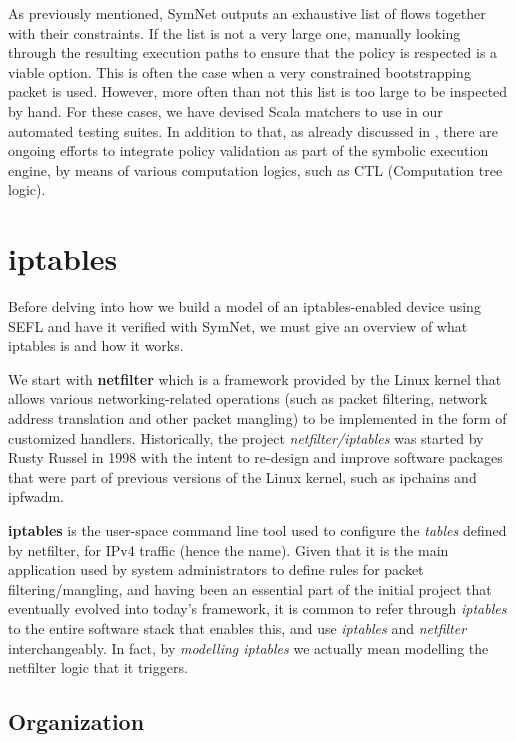 As previously mentioned, SymNet outputs an exhaustive list of flows together
with their constraints.  If the list is not a very large one, manually looking
through the resulting execution paths to ensure that the policy is respected is
a viable option.  This is often the case when a very constrained bootstrapping
packet is used.  However, more often than not this list is too large to be
inspected by hand.  For these cases, we have devised Scala matchers to use in
our automated testing suites.  In addition to that, as already discussed in
, there are ongoing efforts to
integrate policy validation as part of the symbolic execution engine, by means
of various computation logics, such as CTL (Computation tree
logic).


\section{iptables}

Before delving into how we build a model of an iptables-enabled device using
SEFL and have it verified with SymNet, we must give an overview of what
iptables is and how it works.

We start with \textbf{netfilter} which is a framework provided by the Linux
kernel that allows various networking-related operations (such as packet
filtering, network address translation and other packet mangling) to be
implemented in the form of customized handlers.  Historically, the project
\emph{netfilter/iptables} was started by Rusty Russel in 1998 with the intent
to re-design and improve software packages that were part of previous versions
of the Linux kernel, such as ipchains and ipfwadm.

\textbf{iptables} is the user-space command line tool used to configure the
\emph{tables} defined by netfilter, for IPv4 traffic (hence the name). Given
that it is the main application used by system administrators to define rules
for packet filtering/mangling, and having been an essential part of the initial
project that eventually evolved into today's framework, it is common to refer
through \emph{iptables} to the entire software stack that enables this, and use
\emph{iptables} and \emph{netfilter} interchangeably.  In fact, by
\emph{modelling iptables} we actually mean modelling the netfilter logic that
it triggers.


\subsection{Organization}

